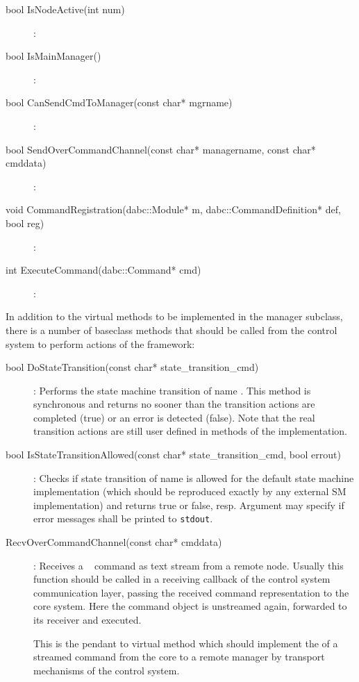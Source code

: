 \begin{description}
\item[bool IsNodeActive(int num)] : 





\item[bool IsMainManager()] :


\item[bool CanSendCmdToManager(const char* mgrname)] :


\item[bool SendOverCommandChannel(const char* managername, const char* cmddata)] :

\item[void CommandRegistration(dabc::Module* m, dabc::CommandDefinition* def, bool reg)] :


\item[int ExecuteCommand(dabc::Command* cmd)] :


 

\end{description}

In addition to the virtual methods to be implemented in the manager subclass,
there is a number of  baseclass methods 
that should be called from the control system to perform actions of the 
framework:

\begin{description}

 
\item[bool DoStateTransition(const char* state\_transition\_cmd)] :
Performs the state machine transition of name .
This method is synchronous and returns no sooner than the 
transition actions are completed (true) or an error is detected (false).
Note that the real transition actions are still user defined in methods
of the  implementation.

\item[bool IsStateTransitionAllowed(const char* state\_transition\_cmd, bool errout)] :
Checks if state transition of name  is allowed
for the default state machine implementation (which should be reproduced exactly by
any external SM implementation) and returns true or false, resp. Argument
 may specify if error messages shall be printed to {\tt stdout}.

\item[RecvOverCommandChannel(const char* cmddata)] :
Receives a \dabc~ command as text stream  
from a remote node. Usually this function should be called in a
receiving callback of the control system communication layer,
passing the received command representation to the core system.
Here the command object is unstreamed again, forwarded to its
receiver and executed.

This is the pendant to virtual method 
 which should implement the  
of a streamed command from the core to a remote manager by transport mechanisms of the control system. 

 
 
\end{description}



